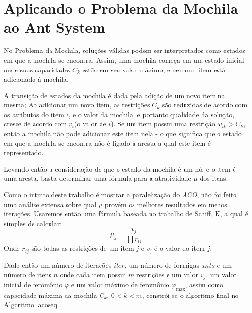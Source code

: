 \section{Aplicando o Problema da Mochila ao Ant System}
No Problema da Mochila, soluções válidas podem ser interpretados como estados em que a mochila se encontra. Assim, uma mochila começa em um estado inicial onde suas capacidades $C_k$ estão em seu valor máximo, e nenhum item está adicionado à mochila.

A transição de estados da mochila é dada pela adição de um novo item na mesma; Ao adicionar um novo item, as restrições $C_k$ são reduzidas de acordo com os atributos do item $i$, e o valor da mochila, e portanto qualidade da solução, cresce de acordo com $v_i$(o valor de $i$). Se um item possui uma restrição $w_{ik}>C_k$, então a mochila não pode adicionar este item nela - o que significa que o estado em que a mochila se encontra não é ligado à aresta a qual este item é representado.

Levando então a consideração de que o estado da mochila é um nó, e o item é uma aresta, basta determinar uma fórmula para a atratividade $\mu$ dos itens.

Como o intuito deste trabalho é mostrar a paralelização do \textit{ACO}, não foi feito uma análise extensa sobre qual $\mu$ provém os melhores resultados em menos iterações. Usaremos então uma fórmula baseada no trabalho de Schiff, K\cite{aco:schiff}, a qual é simples de calcular:
$$
	\mu_j = \dfrac{v_j}{
		\prod r_{ij}}
$$
Onde $r_{ij}$ são todas as restrições de um item $j$ e $v_j$ é o valor do item $j$.

Dado então um número de iterações $iter$, um número de formigas $ants$ e um número de itens $n$ onde cada item possui $m$ restrições e um valor $v_j$, um valor inicial de feromônio $\varphi$ e um valor máximo de feromônio $\varphi_{\max}$, assim como capacidade máxima da mochila $C_k$, $0<k<m$, constrói-se o algoritmo final no Algoritmo \ref{acoseq}.

